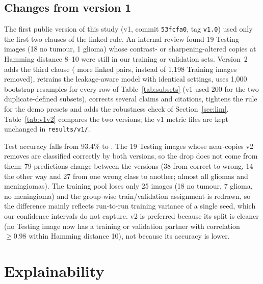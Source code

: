 \documentclass[11pt,a4paper]{article}
\begin{document}
\subsection{Changes from version 1}\label{sec:v1v2}
The first public version of this study (v1, commit \texttt{53fcfa0}, tag \texttt{v1.0}) used only the first two clauses of the linked rule. An internal review found 19 Testing images (18 no tumour, 1 glioma) whose contrast- or sharpening-altered copies at Hamming distance 8--10 were still in our training or validation sets. Version~2 adds the third clause (\DExtraPairsVTwoRule{} more linked pairs, \DTrainImgRemovedCrossSplit{} instead of 1{,}198 Training images removed), retrains the leakage-aware model with identical settings, uses 1{,}000 bootstrap resamples for every row of Table~\ref{tab:subsets} (v1 used 200 for the two duplicate-defined subsets), corrects several claims and citations, tightens the rule for the demo presets and adds the robustness check of Section~\ref{sec:lim}. Table~\ref{tab:v1v2} compares the two versions; the v1 metric files are kept unchanged in \texttt{results/v1/}.

Test accuracy falls from 93.4\% to \AccCFull{}. The 19 Testing images whose near-copies v2 removes are classified correctly by both versions, so the drop does not come from them: 79 predictions change between the versions (38 from correct to wrong, 14 the other way and 27 from one wrong class to another; almost all gliomas and meningiomas). The training pool loses only 25 images (18 no tumour, 7 glioma, no meningioma) and the group-wise train/validation assignment is redrawn, so the difference mainly reflects run-to-run training variance of a single seed, which our confidence intervals do not capture. v2 is preferred because its split is cleaner (no Testing image now has a training or validation partner with correlation $\ge 0.98$ within Hamming distance 10), not because its accuracy is lower.

\begin{table}[t]
\centering\small
\caption{Leakage-aware model, v1 (commit \texttt{53fcfa0}) versus v2, on the same 1{,}600 Testing images. All values are read from the saved metric files of each version.}
\label{tab:v1v2}
\resizebox{\linewidth}{!}{}
\end{table}

\section{Explainability}
\end{document}
